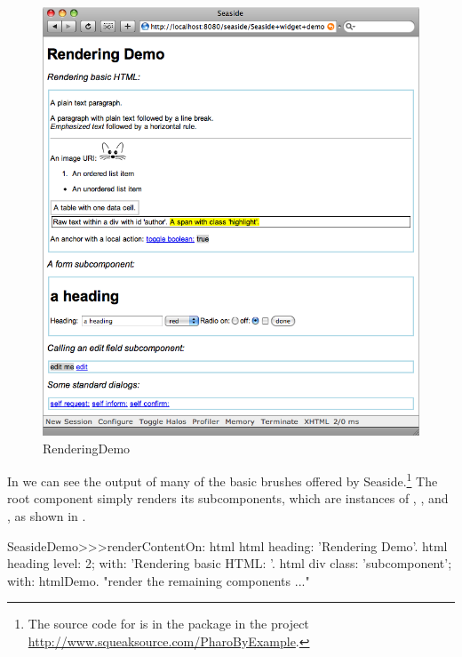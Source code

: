 \documentclass[a4paper,10pt,twoside]{book}
\begin{document}
\begin{figure}[ht]
\begin{center}
\includegraphics[width=\textwidth]{RenderingDemo}
\caption{RenderingDemo}
\end{center}
\end{figure}

In  we can see the output of many of the basic brushes offered by Seaside.\footnote{The source code for  is in the package  in the project \url{http://www.squeaksource.com/PharoByExample}.}
The root component  simply renders its subcomponents, which are instances of , ,  and , as shown in .

\needspace{7ex}
\begin{method}[renderdemo]{}
SeasideDemo>>>renderContentOn: html
	html heading: 'Rendering Demo'.
	html heading
		level: 2;
		with: 'Rendering basic HTML: '.
	html div
		class: 'subcomponent';
		with: htmlDemo.
	"render the remaining components ..."
\end{method}
\end{document}
